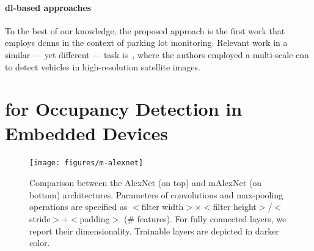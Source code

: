 \paragraph{\gls{dl}-based approaches}
To the best of our knowledge, the proposed approach is the first work that employs \glspl{dcnn} in the context of parking lot monitoring.
Relevant work in a similar --- yet different --- task is~\cite{chen2014vehicle}, where the authors employed a multi-scale \gls{cnn} to detect vehicles in high-resolution satellite images.

\section{ for Occupancy Detection in Embedded Devices}
\label{sec:mini:occupancy-detection}

\begin{figure}
    \texttt{[image: figures/m-alexnet]}
    \caption{Comparison between the AlexNet (on top) and mAlexNet (on bottom) architectures.
    Parameters of convolutions and max-pooling operations are specified as $<$filter width$>\times<$filter height$>$/$<$stride$>+<$padding$>$ (\# features).
    For fully connected layers, we report their dimensionality.
    Trainable layers are depicted in darker color.}
    \label{fig:mini:cnns}
\end{figure}

